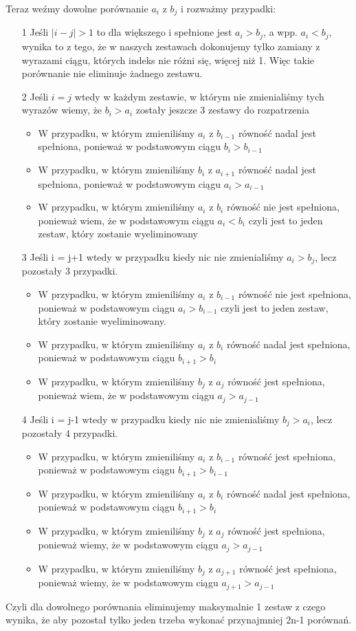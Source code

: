 \documentclass[12pt,a4paper]{article}
\begin{document}
Teraz weźmy dowolne porównanie $a_i$ z $b_j$ i rozważmy przypadki:
\begin{itemize}
    \item[1] Jeśli $|i-j| > 1$ to  dla większego i spełnione jest $a_i > b_j$, a wpp. $a_i < b_j$, wynika to z tego, że w naszych zestawach dokonujemy tylko zamiany z wyrazami ciągu, których indeks nie różni się, więcej niż 1. Więc takie porównanie nie eliminuje żadnego zestawu.
    \item[2] Jeśli $i = j$ wtedy w każdym zestawie, w którym nie zmienialiśmy tych wyrazów wiemy, że $b_i > a_i$ zostały jeszcze 3 zestawy do rozpatrzenia
    \begin{itemize}
        \item W przypadku, w którym zmieniliśmy $a_i$ z $b_{i-1}$ równość nadal jest spełniona, ponieważ w podstawowym ciągu $b_i > b_{i-1}$
        \item W przypadku, w którym zmieniliśmy $b_{i}$ z $a_{i+1}$ równość nadal jest spełniona, ponieważ w podstawowym ciągu $a_i > a_{i-1}$
        \item W przypadku, w którym zmieniliśmy $a_i$ z $b_i$ równość nie jest spełniona, ponieważ wiem, że w podstawowym ciągu $a_i < b_i$ czyli jest to jeden zestaw, który zostanie wyeliminowany
    \end{itemize}
    \item[3] Jeśli i = j+1 wtedy w przypadku kiedy nic nie zmienialiśmy $a_i > b_j$, lecz pozostały 3 przypadki.
    \begin{itemize}
        \item W przypadku, w którym zmieniliśmy $a_i$ z $b_{i-1}$ równość nie jest spełniona, ponieważ w podstawowym ciągu $a_i > b_{i-1}$ czyli jest to jeden zestaw, który zostanie wyeliminowany.
        \item W przypadku, w którym zmieniliśmy $a_{i}$ z $b_i$ równość nadal jest spełniona, ponieważ w podstawowym ciągu $b_{i+1} > b_i$
        \item W przypadku, w którym zmieniliśmy $b_j$ z $a_j$ równość jest spełniona, ponieważ wiem, że w podstawowym ciągu $a_j > a_{j-1}$
    \end{itemize}
    \item[4] Jeśli i = j-1 wtedy w przypadku kiedy nic nie zmienialiśmy $b_j > a_i$, lecz pozostały 4 przypadki.
    \begin{itemize}
        \item W przypadku, w którym zmieniliśmy $a_i$ z $b_{i-1}$ równość jest spełniona, ponieważ w podstawowym ciągu $b_{i+1} > b_{i-1}$
        \item W przypadku, w którym zmieniliśmy $a_{i}$ z $b_i$ równość nadal jest spełniona, ponieważ w podstawowym ciągu $b_{i+1} > b_i$
        \item W przypadku, w którym zmieniliśmy $b_j$ z $a_j$ równość jest spełniona, ponieważ wiemy, że w podstawowym ciągu $a_j > a_{j-1}$ 
        \item W przypadku, w którym zmieniliśmy $b_j$ z $a_{j+1}$ równość jest spełniona, ponieważ wiemy, że w podstawowym ciągu $a_{j+1} > a_{j-1}$ 
    \end{itemize}
\end{itemize}
Czyli dla dowolnego porównania eliminujemy maksymalnie 1 zestaw z czego wynika, że aby pozostał tylko jeden trzeba wykonać przynajmniej 2n-1 porównań.
\end{document}
